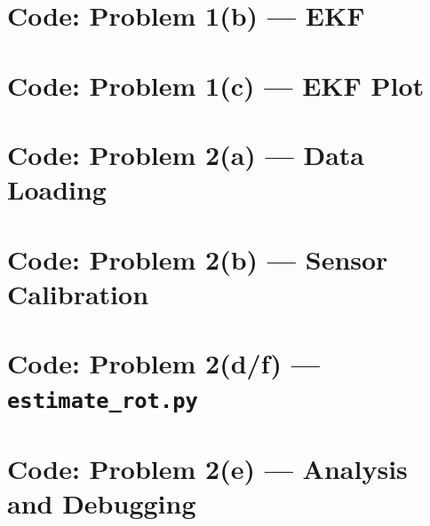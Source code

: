 \documentclass[11pt, reqno, letterpaper]{amsart}
\theoremstyle{plain}
\theoremstyle{definition}
\begin{document}
\section{Code: Problem 1(b) — EKF}


\section{Code: Problem 1(c) — EKF Plot}


\section{Code: Problem 2(a) — Data Loading}


\section{Code: Problem 2(b) — Sensor Calibration}


\section{Code: Problem 2(d/f) — \texttt{estimate\_rot.py}}


\section{Code: Problem 2(e) — Analysis and Debugging}

\end{document}
